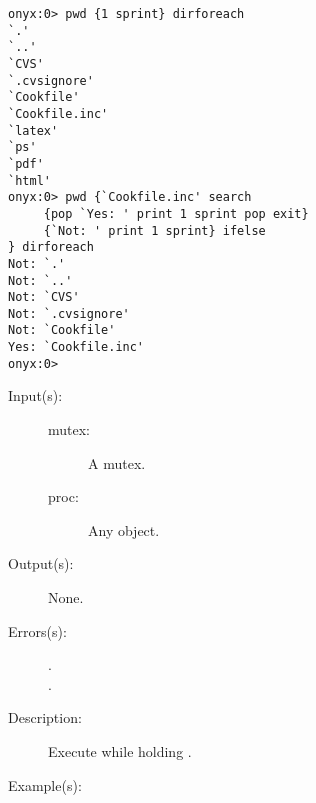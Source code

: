 \begin{description}
\begin{description}
\begin{verbatim}
onyx:0> pwd {1 sprint} dirforeach
`.'
`..'
`CVS'
`.cvsignore'
`Cookfile'
`Cookfile.inc'
`latex'
`ps'
`pdf'
`html'
onyx:0> pwd {`Cookfile.inc' search
     {pop `Yes: ' print 1 sprint pop exit}
     {`Not: ' print 1 sprint} ifelse
} dirforeach
Not: `.'
Not: `..'
Not: `CVS'
Not: `.cvsignore'
Not: `Cookfile'
Yes: `Cookfile.inc'
onyx:0>
		\end{verbatim}
	\end{description}
\label{systemdict:monitor}
\item[{\onyxop{mutex proc}{monitor}{--}}: ]
	\begin{description}\item[]
	\item[Input(s): ]
		\begin{description}\item[]
		\item[mutex: ]
			A mutex.
		\item[proc: ]
			Any object.
		\end{description}
	\item[Output(s): ] None.
	\item[Errors(s): ]
		\begin{description}\item[]
		\item[.]
		\item[.]
		\end{description}
	\item[Description: ]
		Execute  while holding .
	\item[Example(s): ]\begin{verbatim}


\end{verbatim}
\end{description}
\end{description}
